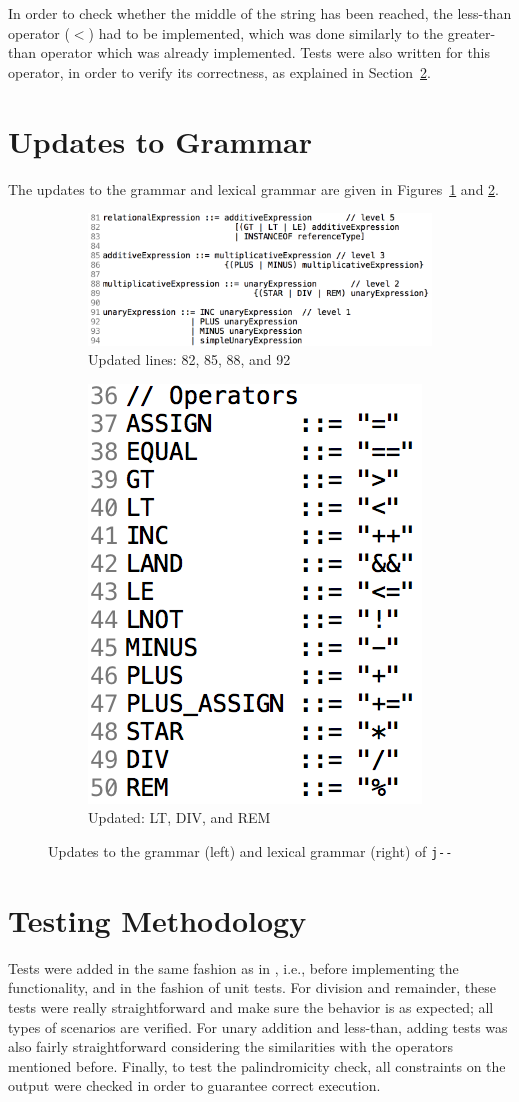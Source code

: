 \documentclass[11pt]{article}
\begin{document}
In order to check whether the middle of the string has been reached, the less-than operator (\(<\)) had to be implemented, which was done similarly to the greater-than operator which was already implemented.
Tests were also written for this operator, in order to verify its correctness, as explained in Section~\ref{sec:test}.

\section{Updates to Grammar}
The updates to the grammar and lexical grammar are given in Figures~\ref{fig:gram} and \ref{fig:lexical}.
\begin{figure}[H]
	\centering
	\begin{subfigure}[t]{0.5\textwidth}
		\centering
		\includegraphics[width=0.87\linewidth]{img/grammar.png}
		\caption{Updated lines: 82, 85, 88, and 92}
		\label{fig:gram}
	\end{subfigure}\hfill
	\begin{subfigure}[t]{0.5\textwidth}
		\centering
		\includegraphics[width=0.27\linewidth]{img/lexicalgrammar.png}
		\caption{Updated: LT, DIV, and REM}
		\label{fig:lexical}
	\end{subfigure}
	\caption{Updates to the grammar (left) and lexical grammar (right) of \texttt{j-\(\)-}}
	\label{fig:grammar}
\end{figure}

\section{Testing Methodology}
\label{sec:test}
Tests were added in the same fashion as in \cite{compilers}, i.e., before implementing the functionality, and in the fashion of unit tests.
For division and remainder, these tests were really straightforward and make sure the behavior is as expected; all types of scenarios are verified.
For unary addition and less-than, adding tests was also fairly straightforward considering the similarities with the operators mentioned before.
Finally, to test the palindromicity check, all constraints on the output were checked in order to guarantee correct execution.
\end{document}
